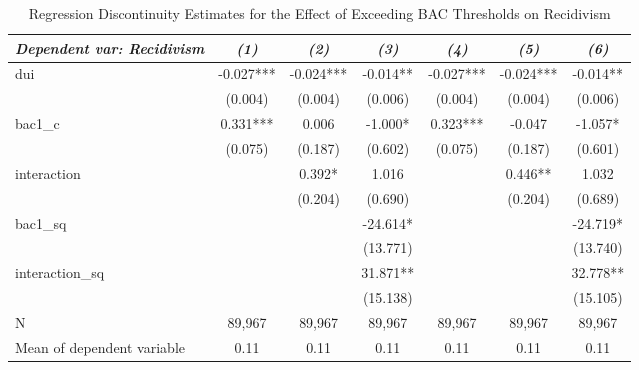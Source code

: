 \begin{table}[htbp]\centering
\small
\caption{Regression Discontinuity Estimates for the Effect of Exceeding BAC Thresholds on Recidivism}
\begin{center}
\begin{threeparttable}
\begin{tabular}{l*{6}{c}}
\toprule
\multicolumn{1}{l}{\textit{Dependent var: Recidivism }}&
\multicolumn{1}{c}{\textit{(1)}}&
\multicolumn{1}{c}{\textit{(2)}}&
\multicolumn{1}{c}{\textit{(3)}}&
\multicolumn{1}{c}{\textit{(4)}}&
\multicolumn{1}{c}{\textit{(5)}}&
\multicolumn{1}{c}{\textit{(6)}}\\
\midrule
dui                 &      -0.027***&      -0.024***&      -0.014** &      -0.027***&      -0.024***&      -0.014** \\
                    &     (0.004)   &     (0.004)   &     (0.006)   &     (0.004)   &     (0.004)   &     (0.006)   \\
bac1\_c              &       0.331***&       0.006   &      -1.000*  &       0.323***&      -0.047   &      -1.057*  \\
                    &     (0.075)   &     (0.187)   &     (0.602)   &     (0.075)   &     (0.187)   &     (0.601)   \\
interaction         &               &       0.392*  &       1.016   &               &       0.446** &       1.032   \\
                    &               &     (0.204)   &     (0.690)   &               &     (0.204)   &     (0.689)   \\
bac1\_sq             &               &               &     -24.614*  &               &               &     -24.719*  \\
                    &               &               &    (13.771)   &               &               &    (13.740)   \\
interaction\_sq      &               &               &      31.871** &               &               &      32.778** \\
                    &               &               &    (15.138)   &               &               &    (15.105)   \\
\midrule
N                   &      89,967   &      89,967   &      89,967   &      89,967   &      89,967   &      89,967   \\
Mean of dependent variable&        0.11   &        0.11   &        0.11   &        0.11   &        0.11   &        0.11   \\

\end{tabular}
\end{threeparttable}
\end{center}
\end{table}
